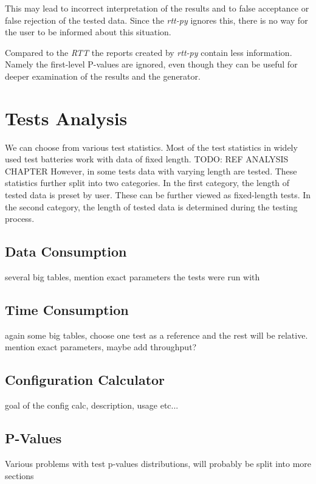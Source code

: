 \documentclass[
  digital,     %
  oneside,     %
  nosansbold,  %
  nocolorbold, %
  nolof,         %
  nolot,         %
]{fithesis4}
\begin{document}
This may lead to incorrect interpretation of the results and to false acceptance or false rejection of the tested data. Since the \emph{rtt-py} ignores this, there is no way for the user to be informed about this situation.

Compared to the \emph{RTT} the reports created by \emph{rtt-py} contain less information. Namely the first-level P-values are ignored, even though they can be useful for deeper examination of the results and the generator.



\chapter{Tests Analysis} 
We can choose from various test statistics. Most of the test statistics in widely used test batteries work with data of fixed length. TODO: REF ANALYSIS CHAPTER However, in some tests data with varying length are tested. These statistics further split into two categories. In the first category, the length of tested data is preset by user. These can be further viewed as fixed-length tests. In the second category, the length of tested data is determined during the testing process.

\section{Data Consumption} \label{chap:analysis-data}
several big tables, mention exact parameters the tests  were run with

\section{Time Consumption} 
again some big tables, choose one test as a reference and the rest will be relative. mention exact parameters, maybe add throughput?
\section{Configuration Calculator}
goal of the config calc, description, usage etc...
\section{P-Values}
Various problems with test p-values distributions, will probably be split into more sections



\end{document}
